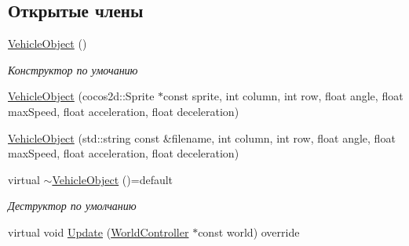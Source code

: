 \subsection*{Открытые члены}
\begin{DoxyCompactItemize}
\item 
\mbox{\label{classrtm_1_1_vehicle_object_a11e3aa43d731f461ed503fb26c48ea5c}} 
\hyperlink{classrtm_1_1_vehicle_object_a11e3aa43d731f461ed503fb26c48ea5c}{Vehicle\+Object} ()
\begin{DoxyCompactList}\small\item\em Конструктор по умочанию \end{DoxyCompactList}\item 
\hyperlink{classrtm_1_1_vehicle_object_aa14dd490d0828a12ab1e8f32bab4c98b}{Vehicle\+Object} (cocos2d\+::\+Sprite $\ast$const sprite, int column, int row, float angle, float max\+Speed, float acceleration, float deceleration)
\item 
\hyperlink{classrtm_1_1_vehicle_object_aee37c55d41eb445704b51f24cb7865cb}{Vehicle\+Object} (std\+::string const \&filename, int column, int row, float angle, float max\+Speed, float acceleration, float deceleration)
\item 
\mbox{\label{classrtm_1_1_vehicle_object_a06fe20ebdc790885520022d7f59868c0}} 
virtual \hyperlink{classrtm_1_1_vehicle_object_a06fe20ebdc790885520022d7f59868c0}{$\sim$\+Vehicle\+Object} ()=default
\begin{DoxyCompactList}\small\item\em Деструктор по умолчанию \end{DoxyCompactList}\item 
virtual void \hyperlink{classrtm_1_1_vehicle_object_a1e089c8acf528660417a21c75658d546}{Update} (\hyperlink{classrtm_1_1_world_controller}{World\+Controller} $\ast$const world) override
\end{DoxyCompactItemize}
